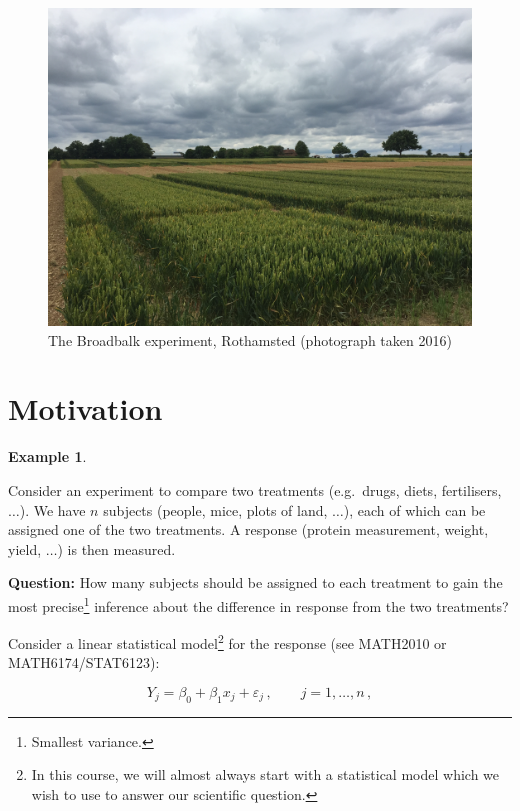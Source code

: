 \documentclass[
]{book}
\theoremstyle{definition}
\theoremstyle{definition}
\newtheorem{example}{Example}[chapter]
\theoremstyle{definition}
\theoremstyle{definition}
\theoremstyle{remark}
\begin{document}
\begin{figure}
 
 {\centering \includegraphics[width=0.75\linewidth]{figures/broadbalk} 
 
 }
 
 \caption{The Broadbalk experiment, Rothamsted (photograph taken 2016)}\label{fig:broadbalk}
 \end{figure}

\hypertarget{motivation}{%
\section{Motivation}\label{motivation}}

\begin{example}
\protect\hypertarget{exm:motivation}{}\label{exm:motivation}

Consider an experiment to compare two treatments (e.g.~drugs, diets, fertilisers, \(\dots\)). We have \(n\) subjects (people, mice, plots of land, \(\dots\)), each of which can be assigned one of the two treatments. A response (protein measurement, weight, yield, \(\dots\)) is then measured.

\end{example}

\textbf{Question:} How many subjects should be assigned to each treatment to gain the most precise\footnote{Smallest variance.} inference about the difference in response from the two treatments?

Consider a linear statistical model\footnote{In this course, we will almost always start with a statistical model which we wish to use to answer our scientific question.} for the response (see MATH2010 or MATH6174/STAT6123):

\begin{equation}
Y_j=\beta_{0}+\beta_{1}x_j+\varepsilon_j\,,\qquad j=1, \ldots, n\,,
\label{eq:slr}
\end{equation}
\end{document}
